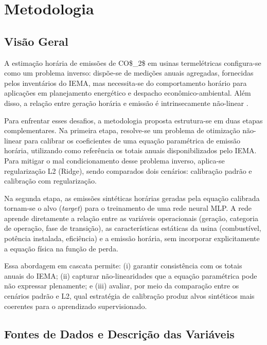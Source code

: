 \chapter{Metodologia}\label{chp:met}

\section{Visão Geral}

A estimação horária de emissões de \ac{CO$_2$} em usinas termelétricas configura-se como um problema inverso: dispõe-se de medições anuais agregadas, fornecidas pelos inventários do \ac{IEMA}, mas necessita-se do comportamento horário para aplicações em planejamento energético e despacho econômico-ambiental. Além disso, a relação entre geração horária e emissão é intrinsecamente não-linear \cite{gent1971minimum, talaq1994summary}.

Para enfrentar esses desafios, a metodologia proposta estrutura-se em duas etapas complementares. Na primeira etapa, resolve-se um problema de otimização não-linear para calibrar os coeficientes de uma equação paramétrica de emissão horária, utilizando como referência os totais anuais disponibilizados pelo \ac{IEMA}. Para mitigar o mal condicionamento desse problema inverso, aplica-se regularização L2 (Ridge), sendo comparados dois cenários: calibração padrão e calibração com regularização.

Na segunda etapa, as emissões sintéticas horárias geradas pela equação calibrada tornam-se o alvo (\textit{target}) para o treinamento de uma rede neural \ac{MLP}. A rede aprende diretamente a relação entre as variáveis operacionais (geração, categoria de operação, fase de transição), as características estáticas da usina (combustível, potência instalada, eficiência) e a emissão horária, sem incorporar explicitamente a equação física na função de perda.

Essa abordagem em cascata permite: (i) garantir consistência com os totais anuais do \ac{IEMA}; (ii) capturar não-linearidades que a equação paramétrica pode não expressar plenamente; e (iii) avaliar, por meio da comparação entre os cenários padrão e L2, qual estratégia de calibração produz alvos sintéticos mais coerentes para o aprendizado supervisionado.

\section{Fontes de Dados e Descrição das Variáveis}

